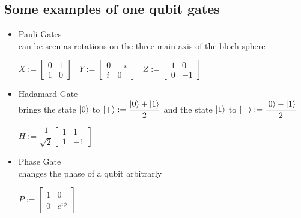 \documentclass{article}
\begin{document}
\subsection{Some examples of one qubit gates}

\begin{itemize}

	\item Pauli Gates\\
	      can be seen as rotations on the three main axis of the bloch
	      sphere
	      \begin{center}
		      $	X:=\begin{bmatrix}
				      0 & 1 \\
				      1 & 0
			      \end{bmatrix}
			      \hspace{10pt}
			      Y:=\begin{bmatrix}
				      0 & -i \\
				      i & 0
			      \end{bmatrix}
			      \hspace{10pt}
			      Z:=\begin{bmatrix}
				      1 & 0  \\
				      0 & -1
			      \end{bmatrix}$
	      \end{center}


	\item Hadamard Gate\\
	      brings the state $\ket{0}$ to
	      $\ket{+} := \dfrac{\ket{0}+\ket{1}}{2}$
	      and the state $\ket{1}$ to $\ket{-} := \dfrac{\ket{0}-\ket{1}}{2}$
	      \begin{center}
		      $	H:=\dfrac{1}{\sqrt{2}}\begin{bmatrix}
				      1 & 1  \\
				      1 & -1
			      \end{bmatrix}$
	      \end{center}

	\item Phase Gate \\
	      changes the phase of a qubit arbitrarly
	      \begin{center}


		      $	P:=\begin{bmatrix}
				      1 & 0         \\
				      0 & e^{i\phi}
			      \end{bmatrix}$
	      \end{center}
\end{itemize}
\end{document}
